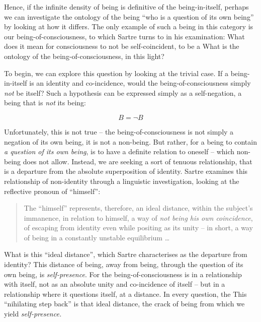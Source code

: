 Hence, if the infinite density of being is definitive of the being-in-itself, perhaps we can investigate the ontology of the being \enquote{who is a question of its own being} by looking at how it differs. The only example of such a being in this category is our being-of-consciousness, to which Sartre turns to in his examination:  What does it mean for consciousness to not be self-coincident, to be a  What is the ontology of the being-of-consciousness, in this light?

To begin, we can explore this question by looking at the trivial case. If a being-in-itself is an identity and co-incidence, would the being-of-consciousness simply \emph{not} be itself? Such a hypothesis can be expressed simply as a self-negation, a being that is \emph{not} its being:

\begin{equation}
    B = \neg B
\end{equation}

\noindent
Unfortunately, this is not true -- the being-of-consciousness is not simply a negation of its own being, it is not a non-being. But rather, for a being to contain \emph{a question of its own being}, is to have a definite relation to oneself -- which non-being does not allow. Instead, we are seeking a sort of tenuous relationship, that is a departure from the absolute superposition of identity. Sartre examines this relationship of non-identity through a linguistic investigation, looking at the reflective pronoun of \enquote{himself}:

\blockcquote[126]{Sartre}{%
    The \enquote{himself} represents, therefore, an ideal distance, within the subject's immanence, in relation to himself, a way of \emph{not being his own coincidence}, of escaping from identity even while positing as its unity -- in short, a way of being in a constantly unstable equilibrium \ldots\
}

\noindent
What is this \enquote{ideal distance}, which Sartre characterises as the departure from identity? This distance of being, away from being, through the question of its own being, is \emph{self-presence}. For the being-of-consciousness is in a relationship with itself, not as an absolute unity and co-incidence of itself -- but in a relationship where it questions itself, at a distance. In every question, the  This \enquote{nihilating step back} is that ideal distance, the crack of being from which we yield \emph{self-presence.}

